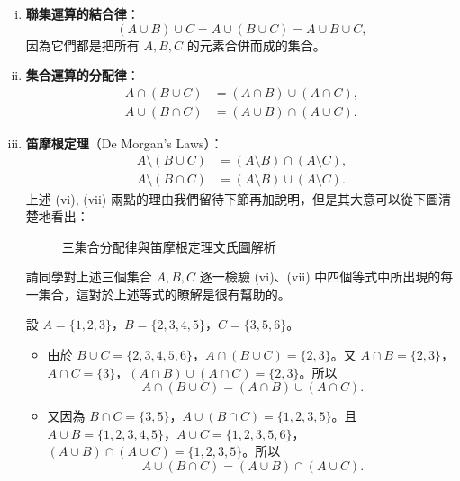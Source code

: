 \begin{enumerate}[(i)]
  \item \textbf{聯集運算的結合律}：
  \begin{equation}\label{eq:assoc_union}
    (A \cup B) \cup C = A \cup (B \cup C) = A \cup B \cup C,
  \end{equation}
  因為它們都是把所有 $A, B, C$ 的元素合併而成的集合。

  \item \textbf{集合運算的分配律}：
  \begin{align}
    A \cap (B \cup C) &= (A \cap B) \cup (A \cap C), \label{eq:dist_cap_over_cup} \\
    A \cup (B \cap C) &= (A \cup B) \cap (A \cup C). \label{eq:dist_cup_over_cap}
  \end{align}

  \item \textbf{笛摩根定理}（De Morgan's Laws）：
  \begin{align}
    A \setminus (B \cup C) &= (A \setminus B) \cap (A \setminus C), \label{eq:demorgan_diff_cup} \\
    A \setminus (B \cap C) &= (A \setminus B) \cup (A \setminus C). \label{eq:demorgan_diff_cap}
  \end{align}
  上述 (vi), (vii) 兩點的理由我們留待下節再加說明，但是其大意可以從下圖清楚地看出：

  \begin{figure}[htbp]
  \centering
  \caption{三集合分配律與笛摩根定理文氏圖解析}\label{fig:venn_three_sets}
  \end{figure}

  請同學對上述三個集合 $A, B, C$ 逐一檢驗 (vi)、(vii) 中四個等式中所出現的每一集合，這對於上述等式的瞭解是很有幫助的。

  \begin{example}\label{ex:2-3-15}
  設 $A = \{1, 2, 3\}$，$B = \{2, 3, 4, 5\}$，$C = \{3, 5, 6\}$。
  \begin{itemize}
    \item 由於 $B \cup C = \{2, 3, 4, 5, 6\}$，$A \cap (B \cup C) = \{2, 3\}$。又 $A \cap B = \{2, 3\}$，$A \cap C = \{3\}$，$(A \cap B) \cup (A \cap C) = \{2, 3\}$。所以
    \begin{equation*}
      A \cap (B \cup C) = (A \cap B) \cup (A \cap C).
    \end{equation*}
    \item 又因為 $B \cap C = \{3, 5\}$，$A \cup (B \cap C) = \{1, 2, 3, 5\}$。且 $A \cup B = \{1, 2, 3, 4, 5\}$，$A \cup C = \{1, 2, 3, 5, 6\}$，$(A \cup B) \cap (A \cup C) = \{1, 2, 3, 5\}$。所以
    \begin{equation*}
      A \cup (B \cap C) = (A \cup B) \cap (A \cup C).
    \end{equation*}
  \end{itemize}
  \end{example}


\end{enumerate}
